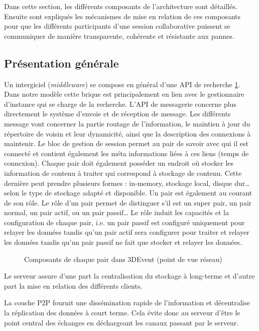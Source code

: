 Dans cette section, les différents composants de l'architecture sont détaillés. 
Ensuite sont expliqués les mécanismes de mise en relation de 
ces composants pour que les différents participants d'une session 
collaborative puissent se communiquer de manière transparente, cohérente et 
résistante aux pannes.


\subsection{Présentation générale}
Un intergiciel (\textit{middleware}) se compose en général d'une API de 
recherche \ref{fig:middleware}.
Dans notre modèle cette brique est principalement en lien avec le 
gestionnaire d'instance qui se charge de la recherche. L'API de messagerie 
concerne plus directement le système d'envoie et de réception de message. Les 
différents message vont concerner la partie routage de l'information, le 
maintien à jour du répertoire de voisin et leur dynamicité, ainsi que la 
description des connexions à maintenir. Le bloc de gestion de session permet au 
pair de savoir avec qui il est connecté et contient également les méta informations 
liées à ces liens (temps de connexion). 
Chaque pair doit également posséder un endroit où stocker les information de 
contenu à traiter qui correspond à stockage de contenu. Cette dernière peut 
prendre plusieurs formes : in-memory, stockage local, disque dur\dots selon le 
type de stockage adapté et disponible.
Un pair est également au courant de son rôle. Le rôle d'un pair permet de 
distinguer s'il est un super pair, un pair normal, un pair actif, ou un pair passif\dots 
Le rôle induit les capacités et la configuration de chaque pair, i.e. un pair passif 
est configuré uniquement pour relayer les données tandis qu'un pair actif sera 
configurer pour traiter et relayer les données tandis qu'un pair passif ne fait que 
stocker et relayer les données.
\begin{figure}[ht]
	\centering
	\caption{Composants de chaque pair dans 3DEvent (point de vue réseau)}
	\label{fig:middleware}
\end{figure}

Le serveur assure d'une part la centralisation du stockage à long-terme et d'autre 
part la mise en relation des différents clients.

La couche \gls{P2P} fournit une dissémination rapide de l'information et 
décentralise la réplication des données à court terme. Cela évite donc au serveur 
d'être le point central des échanges en déchargeant les canaux passant par le 
serveur.

